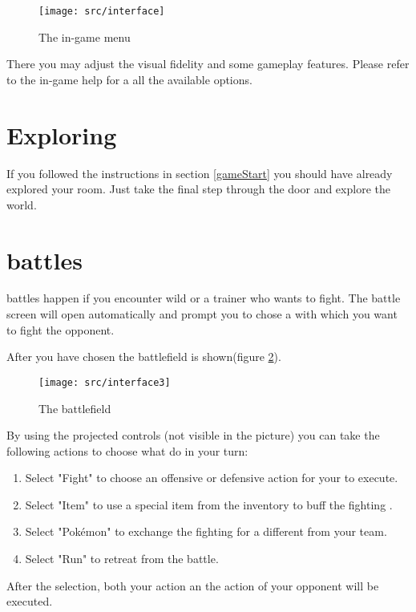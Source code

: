 \begin{figure}[!ht]
\begin{center}
\texttt{[image: src/interface]}
\end{center}
\caption{The in-game menu}
\label{game_menu}
\end{figure}

There you may adjust the visual fidelity and some gameplay features. Please refer to the in-game help for a all the available options.

\section{Exploring}

If you followed the instructions in section \ref{gameStart} you should have already explored your room. Just take the final step through the door and explore the \poke{} world.

\section[\pokeT{} battles]{\poke{} battles}
\poke{} battles happen if you encounter wild \poke{} or a \poke{} trainer who wants to fight. The battle screen will open automatically and prompt you to chose a \poke{} with which you want to fight the opponent.

After you have chosen the battlefield is shown(figure \ref{battle}). 
\begin{figure}[!ht]
\begin{center}
\texttt{[image: src/interface3]}
\end{center}
\caption{The battlefield}
\label{battle}
\end{figure}

By using the projected controls (not visible in the picture) you can take the following actions to choose what do in your turn:
\begin{enumerate}
\item Select "Fight" to choose an offensive or defensive action for your \poke{} to execute.
\item Select "Item" to use a special item from the inventory to buff the fighting \poke{}.
\item Select "Pokémon" to exchange the fighting \poke{} for a different \poke{} from your team.
\item Select "Run" to retreat from the battle.
\end{enumerate}
After the selection, both your action an the action of your opponent will be executed.

